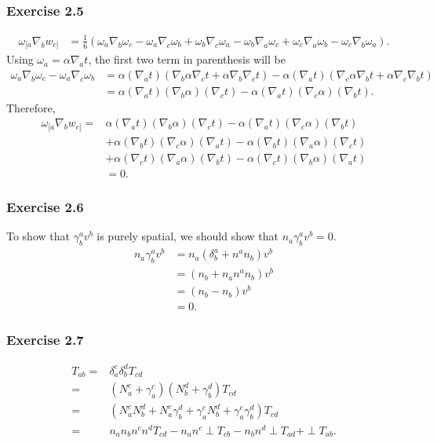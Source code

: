 \documentclass{article}
\begin{document}
\subsubsection*{Exercise 2.5}
\begin{align}
	\omega_{[a}\nabla_b w_{c]} &= \frac{1}{6}(\omega_a \nabla_b \omega_c - \omega_a \nabla_c \omega_b + \omega_b \nabla_c \omega_a - \omega_b \nabla_a \omega_c + \omega_c \nabla_a \omega_b - \omega_c \nabla_b \omega_a).
\end{align}
Using $\omega_a = \alpha \nabla_a t$, the first two term in parenthesis will be
\begin{align}
	\omega_a \nabla_b \omega_c - \omega_a \nabla_c \omega_b &= \alpha(\nabla_a t)(\nabla_b \alpha \nabla_c t + \alpha \nabla_b \nabla_c t) - \alpha(\nabla_a t)(\nabla_c \alpha \nabla_b t + \alpha \nabla_c \nabla_b t)\\
	&= \alpha (\nabla_a t)(\nabla_b \alpha)(\nabla_c t) - \alpha (\nabla_a t)(\nabla_c \alpha)(\nabla_b t).
\end{align}
Therefore, 
\begin{align}
	\omega_{[a}\nabla_b w_{c]} = & \alpha (\nabla_a t)(\nabla_b \alpha)(\nabla_c t) - \alpha (\nabla_a t)(\nabla_c \alpha)(\nabla_b t)\\
	&+\alpha (\nabla_b t)(\nabla_c \alpha)(\nabla_a t) - \alpha (\nabla_b t)(\nabla_a \alpha)(\nabla_c t)\\
	&+\alpha (\nabla_c t)(\nabla_a \alpha)(\nabla_b t) - \alpha (\nabla_c t)(\nabla_b \alpha)(\nabla_a t)\\
	&= 0.
\end{align}

\subsubsection*{Exercise 2.6}
To show that $\gamma^a_bv^b$ is purely spatial, we should show that $n_a\gamma^a_bv^b=0$.
\begin{align}
	n_a\gamma^a_bv^b &= n_a(\delta^a_b+n^an_b)v^b\\
	&= (n_b + n_an^an_b)v^b\\
	&= (n_b - n_b)v^b\\
	&= 0.
\end{align}

\subsubsection*{Exercise 2.7}
\begin{align}
	T_{ab} =& \delta^c_a\delta^d_bT_{cd}\\
	=& (N^c_a+\gamma^c_a)(N^d_b+\gamma^d_b)T_{cd}\\
	=& (N^c_aN^d_b + N^c_a\gamma^d_b + \gamma^c_aN^d_b+\gamma^c_a\gamma^d_b)T_{cd}\\
	=& n_an_bn^cn^dT_{cd} - n_an^c\perp T_{cb} -n_bn^d\perp T_{ad} + \perp T_{ab}.
\end{align}
\end{document}
